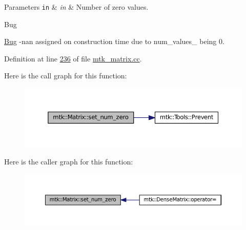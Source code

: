 \begin{DoxyParams}[1]{Parameters}
\mbox{\tt in}  & {\em in} & Number of zero values. \\
\hline
\end{DoxyParams}
\begin{DoxyRefDesc}{Bug}
\item[\hyperlink{bug__bug000001}{Bug}]-\/nan assigned on construction time due to num\+\_\+values\+\_\+ being 0. \end{DoxyRefDesc}


Definition at line \hyperlink{mtk__matrix_8cc_source_l00236}{236} of file \hyperlink{mtk__matrix_8cc_source}{mtk\+\_\+matrix.\+cc}.



Here is the call graph for this function\+:\nopagebreak
\begin{figure}[H]
\begin{center}
\leavevmode
\includegraphics[width=350pt]{classmtk_1_1Matrix_a6eb14709692df59573548ffd8cf67198_cgraph}
\end{center}
\end{figure}




Here is the caller graph for this function\+:\nopagebreak
\begin{figure}[H]
\begin{center}
\leavevmode
\includegraphics[width=350pt]{classmtk_1_1Matrix_a6eb14709692df59573548ffd8cf67198_icgraph}
\end{center}
\end{figure}


